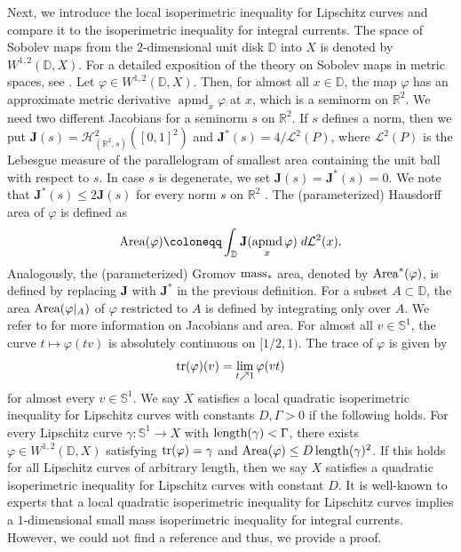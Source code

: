 \documentclass{amsart}
\numberwithin{equation}{section}
\newcommand{\R}{\mathbb{R}}
\newcommand{\Ha}{\mathcal{H}}
\newcommand{\leb}{\mathcal{L}}
\DeclareMathOperator{\len}{\textup{length}}
\DeclareMathOperator{\trace}{\textup{tr}}
\DeclareMathOperator{\area}{\textup{Area}}
\DeclareMathOperator{\apmd}{\operatorname{apmd}}
\begin{document}
        Next, we introduce the local isoperimetric inequality for Lipschitz curves and compare it to the isoperimetric inequality for integral currents. The space of Sobolev maps from the $2$-dimensional unit disk $\mathbb{D}$ into $X$ is denoted by $W^{1,2}(\mathbb{D},X)$. For a detailed exposition of the theory on Sobolev maps in metric spaces, see \cite{Heinonen-Koskela-Shanmugalingam-Tyson-2015}. Let $\varphi \in W^{1,2}(\mathbb{D},X)$. Then, for almost all $x \in \mathbb{D}$, the map $\varphi$ has an approximate metric derivative $\apmd_x \varphi$ at $x$, which is a seminorm on $\R^2$. We need two different Jacobians for a seminorm $s$ on $\R^2$. If $s$ defines a norm, then we put $\mathbf{J}(s) = \Ha^2_{(\R^2,s)}([0,1]^2)$ and $\mathbf{J}^*(s) = 4/ \leb^2(P)$, where $\leb^2(P)$ is the Lebesgue measure of the parallelogram of smallest area containing the unit ball with respect to $s$. In case $s$ is degenerate, we set $\mathbf{J}(s) = \mathbf{J}^*(s) = 0$. We note that
        $ \mathbf{J}^*(s) \leq 2 \mathbf{J}(s)$ for every norm $s$ on $\R^2$ \cite[Lemma 9.2]{ambrosio-kirchheim-2000}. The (parameterized) Hausdorff area of $\varphi$ is defined as 
        $$\area (\varphi) \coloneqq \int_{\mathbb{D}}  \mathbf{J}(\apmd_x \varphi) \; d \leb^2(x).$$
        Analogously, the (parameterized) Gromov $\textup{mass}_*$ area, denoted by $\area^*(\varphi)$, is defined by replacing $\mathbf{J}$ with $\mathbf{J}^*$ in the previous definition. For a subset $A \subset \mathbb{D}$, the area $\area(\varphi|_A)$ of $\varphi$ restricted to $A$ is defined by integrating only over $A$. We refer to \cite{alvarez-thompson04, Lytchack-wenger-Canonical-parameterizations} for more information on Jacobians and area. For almost all $v \in \mathbb{S}^1$, the curve $t\mapsto \varphi(tv)$ is absolutely continuous on $[1/2,1)$. The trace of $\varphi$ is given by
        $$\trace(\varphi) (v)= \lim_{t \nearrow 1} \varphi(vt)$$
        for almost every $v \in \mathbb{S}^1$. We say $X$ satisfies a local quadratic isoperimetric inequality for Lipschitz curves with constants $D,\Gamma >0$ if the following holds. For every Lipschitz curve $\gamma\colon \mathbb{S}^1 \to X$ with $\textup{length}(\gamma) < 	\Gamma $, there exists  $\varphi\in W^{1,2}(\mathbb{D},X)$ satisfying $\trace (\varphi) = \gamma$ and $\textup{Area}(\varphi) \leq D \len( \gamma)^2$. If this holds for all Lipschitz curves of arbitrary length, then we say $X$ satisfies a quadratic isoperimetric inequality for Lipschitz curves with constant $D$. It is well-known to experts that a local quadratic isoperimetric inequality for Lipschitz curves implies a $1$-dimensional small mass isoperimetric inequality for integral currents. However, we could not find a reference and thus, we provide a proof. 
\end{document}
